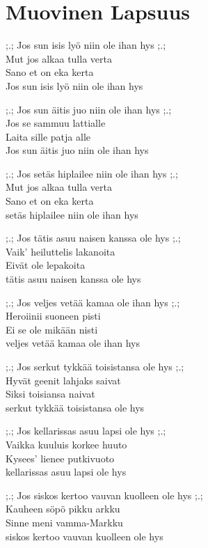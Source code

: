 \section{Muovinen Lapsuus}
;.; Jos sun isis lyö niin ole ihan hys ;.;\\
Mut jos alkaa tulla verta\\
Sano et on eka kerta\\
Jos sun isis lyö niin ole ihan hys

;.; Jos sun äitis juo niin ole ihan hys ;.;\\
Jos se sammuu lattialle\\
Laita sille patja alle\\
Jos sun äitis juo niin ole ihan hys

;.; Jos setäs hiplailee niin ole ihan hys ;.;\\
Mut jos alkaa tulla verta\\
Sano et on eka kerta\\
setäs hiplailee niin ole ihan hys

;.; Jos tätis asuu naisen kanssa ole hys ;.;\\
Vaik' heiluttelis lakanoita\\
Eivät ole lepakoita\\
tätis asuu naisen kanssa ole hys

;.; Jos veljes vetää kamaa ole ihan hys ;.;\\
Heroiinii suoneen pisti\\
Ei se ole mikään nisti\\
veljes vetää kamaa ole ihan hys

;.; Jos serkut tykkää toisistansa ole hys ;.;\\
Hyvät geenit lahjaks saivat\\
Siksi toisiansa naivat\\
serkut tykkää toisistansa ole hys

;.; Jos kellarissas asuu lapsi ole hys ;.;\\
Vaikka kuuluis korkee huuto\\
Kysees' lienee putkivuoto\\
kellarissas asuu lapsi ole hys

;.; Jos siskos kertoo vauvan kuolleen ole hys ;.;\\
Kauheen söpö pikku arkku\\
Sinne meni vamma-Markku\\
siskos kertoo vauvan kuolleen ole hys
